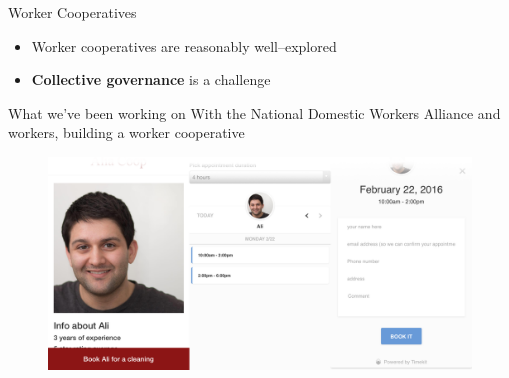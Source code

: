 \documentclass{beamer}
\begin{document}

\begin{frame}{Worker Cooperatives}
  \begin{itemize}[<+- | alert@+>]
    \item Worker cooperatives are reasonably well--explored
      \cite{craig1992behavior,mellor1988worker}
    \item \textbf{Collective governance} is a challenge
      \cite{russell1982collective,ostrom1990governing,polletta2002freedom}
  \end{itemize}
\end{frame}


\begin{frame}{What we've been working on}
    With the National Domestic Workers Alliance and workers,
    building a worker cooperative
  \begin{figure}
    \includegraphics[scale=0.12]{figures/figure.png}  
  \end{figure}
\end{frame}

\end{document}
